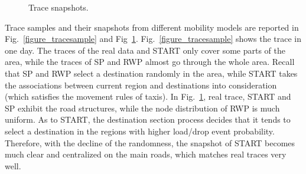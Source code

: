 \begin{figure}[!t]
\centering
{}
\caption{Trace snapshots.}\label{figure_trace_snapshots}
\end{figure}


Trace samples and their snapshots from different mobility models are reported in Fig.~\ref{figure_tracesample} and Fig~\ref{figure_trace_snapshots}. Fig.~\ref{figure_tracesample} shows the trace in one day. The traces of the real data and START only cover some parts of the area, while the traces of SP and RWP almost go through the whole area. Recall that SP and RWP select a destination randomly in the area, while START takes the associations between current region and destinations into consideration (which satisfies the movement rules of taxis). In Fig.~\ref{figure_trace_snapshots}, real trace, START and SP exhibit the road structures, while the node distribution of RWP is much uniform. As to START, the destination section process decides that it tends to select a destination in the regions with higher load/drop event probability. Therefore, with the decline of the randomness, the snapshot of START becomes much clear and centralized on the main roads, which matches real traces very well.

